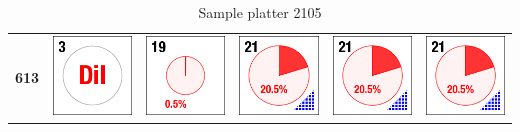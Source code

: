 \begin{table}
\begin{center}
\begin{tabular}{cccccc}
\textbf{613} & \includegraphics{./images/ace_m2_sample_tiles/sample03.png} & \includegraphics{./images/ace_m2_sample_tiles/sample19.png} & \includegraphics{./images/ace_m2_sample_tiles/sample21.png} & \includegraphics{./images/ace_m2_sample_tiles/sample21.png} & \includegraphics{./images/ace_m2_sample_tiles/sample21.png}\\
\end{tabular}
\caption{Sample platter 2105}
\end{center}
\end{table}

\clearpage